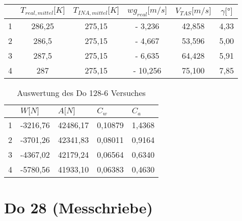\begin{table}[h]
	\centering
	\begin{tabular}{|c|c|c|c|c|c|}
		\hline
		& \multicolumn{1}{l|}{\textbf{$T_{real,mittel} {[}K{]}$}} & \multicolumn{1}{l|}{\textbf{$T_{INA,mittel} {[}K{]}$}} & \textbf{$wg_{real} {[}m/s{]}$} & \textbf{$V_{TAS} {[}m/s{]}$} & \textbf{$\gamma {[}°{]}$} \\ \hline
		1 & 286,25                                        & 275,15                                       & - 3,236                     & 42,858                  & 4,33                   \\ \hline
		2 & 286,5                                         & 275,15                                       & - 4,667                    & 53,596                  & 5,00                   \\ \hline
		3 & 287,5                                         & 275,15                                       & - 6,635                    & 64,428                  & 5,91                   \\ \hline
		4 & 287                                           & 275,15                                       & - 10,256                   & 75,100                  & 7,85                   \\ \hline
	\end{tabular}
\end{table}

\begin{table}[h]
	\centering
	\begin{tabular}{|l|l|l|l|l|}
		\hline
		& \textbf{$W {[}N{]}$} & \textbf{$A {[}N{]}$} & \textbf{$C_w$} & \textbf{$C_a$} \\ \hline
		1 & -3216,76           & 42486,17           & 0,10879     & 1,4368      \\ \hline
		2 & -3701,26           & 42341,83           & 0,08011     & 0,9164      \\ \hline
		3 & -4367,02           & 42179,24           & 0,06564     & 0,6340      \\ \hline
		4 & -5780,56           & 41933,10           & 0,06383     & 0,4630      \\ \hline
	\end{tabular}
	\caption{Auswertung des Do 128-6 Versuches}
\end{table}








\vspace{1cm}
\section{Do 28 (Messchriebe)}

\newpage